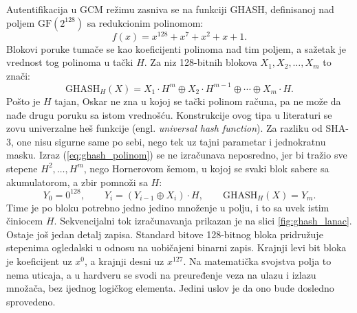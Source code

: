 Autentifikacija u GCM režimu zasniva se na funkciji GHASH, definisanoj nad poljem $\mathrm{GF}(2^{128})$ sa redukcionim polinomom:
\begin{equation}
    f(x) = x^{128} + x^7 + x^2 + x + 1.
    \label{eq:gcm_polinom}
\end{equation}
Blokovi poruke tumače se kao koeficijenti polinoma nad tim poljem, a sažetak je vrednost tog polinoma u tački $H$. Za niz 128-bitnih blokova $X_1, X_2, \ldots, X_m$ to znači:
\begin{equation}
    \mathrm{GHASH}_H(X) = X_1 \cdot H^m \oplus X_2 \cdot H^{m-1} \oplus \cdots \oplus X_m \cdot H.
    \label{eq:ghash_polinom}
\end{equation}
Pošto je $H$ tajan, Oskar ne zna u kojoj se tački polinom računa, pa ne može da nađe drugu poruku sa istom vrednošću. Konstrukcije ovog tipa u literaturi se zovu univerzalne heš funkcije (engl. \textit{universal hash function}). Za razliku od SHA-3, one nisu sigurne same po sebi, nego tek uz tajni parametar i jednokratnu masku.
\smallbreak
Izraz (\ref{eq:ghash_polinom}) se ne izračunava neposredno, jer bi tražio sve stepene $H^2, \ldots, H^m$, nego Hornerovom šemom, u kojoj se svaki blok sabere sa akumulatorom, a zbir pomnoži sa $H$:
\begin{equation}
    Y_0 = 0^{128}, \qquad Y_i = (Y_{i-1} \oplus X_i) \cdot H, \qquad \mathrm{GHASH}_H(X) = Y_m.
    \label{eq:ghash_horner}
\end{equation}
Time je po bloku potrebno jedno jedino množenje u polju, i to sa uvek istim činiocem $H$. Sekvencijalni tok izračunavanja prikazan je na slici \ref{fig:ghash_lanac}.
\smallbreak
Ostaje još jedan detalj zapisa. Standard \cite{sp80038d} bitove 128-bitnog bloka pridružuje stepenima ogledalski u odnosu na uobičajeni binarni zapis. Krajnji levi bit bloka je koeficijent uz $x^0$, a krajnji desni uz $x^{127}$. Na matematička svojstva polja to nema uticaja, a u hardveru se svodi na preuređenje veza na ulazu i izlazu množača, bez ijednog logičkog elementa. Jedini uslov je da ono bude dosledno sprovedeno.

